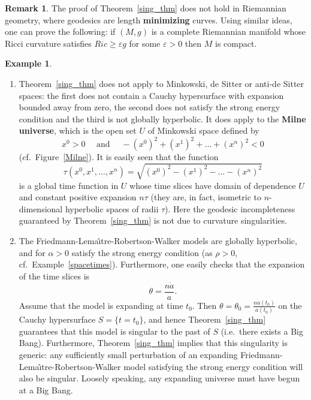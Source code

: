 \documentclass[12pt]{amsart}
\theoremstyle{definition}
\newtheorem{Example}[Thm]{Example}
\newtheorem{Remark}[Thm]{Remark}
\theoremstyle{remark}
\begin{document}
\begin{Remark}
The proof of Theorem~\ref{sing_thm} does not hold in Riemannian geometry, where geodesics are length {\bf minimizing} curves. Using similar ideas, one can prove the following: if $(M,g)$ is a complete Riemannian manifold whose Ricci curvature satisfies $Ric \geq \varepsilon g$ for some $\varepsilon > 0$ then $M$ is compact.
\end{Remark}

\begin{Example} \hspace{1cm}
\begin{enumerate}
\item
Theorem~\ref{sing_thm} does not apply to Minkowski, de Sitter or anti-de Sitter spaces: the first does not contain a Cauchy hypersurface with expansion bounded away from zero, the second does not satisfy the strong energy condition and the third is not globally hyperbolic. It does apply to the {\bf Milne universe}, which is the open set $U$ of Minkowski space defined by
\[
x^0 > 0 \quad \text{ and } \quad - \left( x^0 \right)^2 + \left( x^1 \right)^2 + \ldots + \left( x^n \right)^2 < 0
\]
(cf.~Figure~\ref{Milne}). It is easily seen that the function
\[
\tau\left( x^0, x^1, \ldots, x^n \right) = \sqrt{\left( x^0 \right)^2 - \left( x^1 \right)^2 - \ldots - \left( x^n \right)^2}
\]
is a global time function in $U$ whose time slices have domain of dependence $U$ and constant positive expansion $n \tau$ (they are, in fact, isometric to $n$-dimensional hyperbolic spaces of radii $\tau$). Here the geodesic incompleteness guaranteed by Theorem~\ref{sing_thm} is not due to curvature singularities.
\item
The Friedmann-Lema\^\i tre-Robertson-Walker models are globally hyperbolic, and for $\alpha > 0$ satisfy the strong energy condition (as $\rho > 0$, cf.~Example~\ref{spacetimes}). Furthermore, one easily checks that the expansion of the time slices is
\[
\theta = \frac{n\dot{a}}{a}.
\]
Assume that the model is expanding at time $t_0$. Then $\theta = \theta_0 = \frac{n\dot{a}(t_0)}{a(t_0)}$ on the Cauchy hypersurface $S = \{ t=t_0 \}$, and hence Theorem~\ref{sing_thm} guarantees that this model is singular to the past of $S$ (i.e.~there exists a Big Bang). Furthermore, Theorem~\ref{sing_thm} implies that this singularity is generic: any sufficiently small perturbation of an expanding Friedmann-Lema\^\i tre-Robertson-Walker model satisfying the strong energy condition will also be singular. Loosely speaking, any expanding universe must have begun at a Big Bang.

\end{enumerate}
\end{Example}
\end{document}
